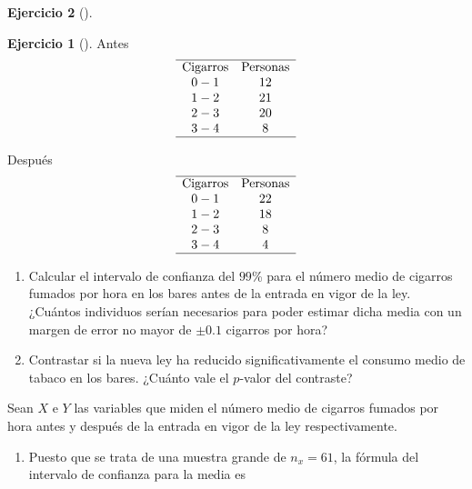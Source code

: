 \documentclass[
  a4paper,
]{scrreport}
\theoremstyle{definition}
\newtheorem{exercise}{Ejercicio}[chapter]
\theoremstyle{remark}
\begin{document}
\begin{exercise}[]
\begin{exercise}[]
Antes \[
\begin{array}{cc}
\hline
\mbox{Cigarros} & \mbox{Personas} \\
0-1 & 12\\
1-2 & 21\\
2-3 & 20\\
3-4 & 8\\
\hline
\end{array}
\]

Después \[
\begin{array}{cc}
\hline
\mbox{Cigarros} & \mbox{Personas} \\
0-1 & 22\\
1-2 & 18\\
2-3 & 8\\
3-4 & 4\\
\hline
\end{array}
\]

\begin{enumerate}
\def\labelenumi{\alph{enumi}.}
\item
  Calcular el intervalo de confianza del \(99\)\% para el número medio
  de cigarros fumados por hora en los bares antes de la entrada en vigor
  de la ley. ¿Cuántos individuos serían necesarios para poder estimar
  dicha media con un margen de error no mayor de \(\pm 0.1\) cigarros
  por hora?
\item
  Contrastar si la nueva ley ha reducido significativamente el consumo
  medio de tabaco en los bares. ¿Cuánto vale el \(p\)-valor del
  contraste?
\end{enumerate}

\end{exercise}

\begin{tcolorbox}[enhanced jigsaw, colbacktitle=quarto-callout-tip-color!10!white, bottomrule=.15mm, bottomtitle=1mm, rightrule=.15mm, colback=white, left=2mm, opacityback=0, title=\textcolor{quarto-callout-tip-color}{\faLightbulb}\hspace{0.5em}{Solución}, leftrule=.75mm, arc=.35mm, titlerule=0mm, coltitle=black, opacitybacktitle=0.6, colframe=quarto-callout-tip-color-frame, breakable, toprule=.15mm, toptitle=1mm]

Sean \(X\) e \(Y\) las variables que miden el número medio de cigarros
fumados por hora antes y después de la entrada en vigor de la ley
respectivamente.

\begin{enumerate}
\def\labelenumi{\alph{enumi}.}
\item
  Puesto que se trata de una muestra grande de \(n_x=61\), la fórmula
  del intervalo de confianza para la media es


\end{enumerate}
\end{tcolorbox}
\end{exercise}
\end{document}

